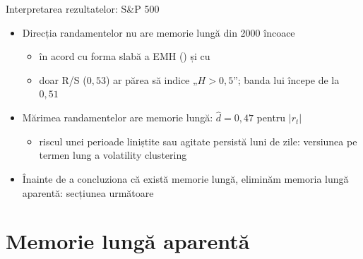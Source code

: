 \begin{frame}{Interpretarea rezultatelor: S\&P 500}
\itemsize{\small}
\begin{itemize}
    \item Direcția randamentelor nu are memorie lungă din 2000 încoace
    \begin{itemize}
        \item în acord cu forma slabă a EMH () și cu 
        \item doar R/S ($0{,}53$) ar părea să indice „$H > 0{,}5$”; banda lui începe de la $0{,}51$
    \end{itemize}
    \item Mărimea randamentelor are memorie lungă: $\hat d = 0{,}47$ pentru $|r_t|$
    \begin{itemize}
        \item riscul unei perioade liniștite sau agitate persistă luni de zile: versiunea pe termen lung a volatility clustering
    \end{itemize}
    \item Înainte de a concluziona că există memorie lungă, eliminăm memoria lungă aparentă: secțiunea următoare
\end{itemize}
\end{frame}


\section{Memorie lungă aparentă}

